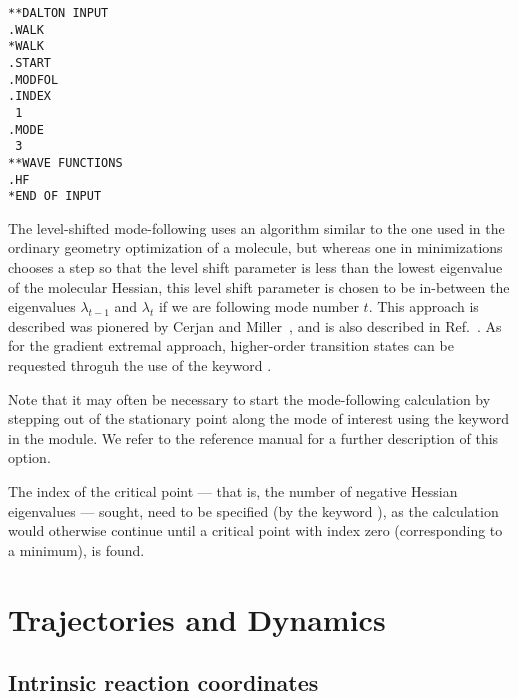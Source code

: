 \begin{verbatim}
**DALTON INPUT
.WALK
*WALK
.START
.MODFOL
.INDEX
 1
.MODE
 3
**WAVE FUNCTIONS
.HF
*END OF INPUT
\end{verbatim}

The level-shifted mode-following uses an algorithm similar to the one
used in the ordinary geometry optimization of a molecule, but whereas
one in minimizations chooses a step so that the level shift parameter
is less than the lowest eigenvalue of the molecular
Hessian, this 
level shift parameter is chosen to be in-between the eigenvalues
$\lambda_{t-1}$ and $\lambda_{t}$ if we are following mode number $t$.
This approach is described was pionered by Cerjan and
Miller~\cite{cjcwhmjcp75}, and is also described in
Ref.~\cite{hjajpjthjcp85}. 
As for the gradient extremal approach, higher-order transition
states
can be requested throguh the use of the keyword .

Note that it may often be necessary to start the mode-following
calculation by stepping out of the stationary point along the 
mode of interest using the keyword  in the
 module. We refer to the reference manual for a further
description of this option.

The index of the critical point  --- that is,
the number of negative Hessian eigenvalues
--- sought, need to 
be specified (by the keyword ), as the calculation would
otherwise continue until a critical point with index zero
(corresponding to a minimum), is found.

\section{Trajectories and Dynamics}

\subsection{Intrinsic reaction coordinates}\label{sec:irc}

\begin{center}
\end{center}

